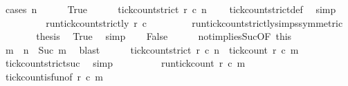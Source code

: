 \begin{isabellebody}
\ {\isacharparenleft}cases\ {\isacartoucheopen}n\ {\isacharequal}\ {}{\isacartoucheclose}{\isacharparenright}\isanewline
\ \ \isamarkupfalse%
\ True\isanewline
\ \ \ \ \isamarkupfalse%
\ {\isacartoucheopen}tick{\isacharunderscore}count{\isacharunderscore}strict\ r\ c\ n\ {\isacharequal}\ {}{\isacartoucheclose}\ \isamarkupfalse%
\ tick{\isacharunderscore}count{\isacharunderscore}strict{\isacharunderscore}def\ \isamarkupfalse%
\ simp\isanewline
\ \ \ \ \isamarkupfalse%
\ \isamarkupfalse%
\ {\isacartoucheopen}{\isachardot}{\isachardot}{\isachardot}\ {\isacharequal}\ run{\isacharunderscore}tick{\isacharunderscore}count{\isacharunderscore}strictly\ r\ c\ {}{\isacartoucheclose}\isanewline
\ \ \ \ \ \ \isamarkupfalse%
\ run{\isacharunderscore}tick{\isacharunderscore}count{\isacharunderscore}strictly{\isachardot}simps{\isacharparenleft}{}{\isacharparenright}{\isacharbrackleft}symmetric{\isacharbrackright}\ \isacommand{{\isachardot}}\isamarkupfalse%
\isanewline
\ \ \ \ \isamarkupfalse%
\ \isamarkupfalse%
\ {\isacharquery}thesis\ \isamarkupfalse%
\ True\ \isamarkupfalse%
\ simp\isanewline
{}\isamarkupfalse%
\isanewline
\ \ \isamarkupfalse%
\ False\isanewline
\ \ \ \ \isamarkupfalse%
\ not{}{\isacharunderscore}implies{\isacharunderscore}Suc{\isacharbrackleft}OF\ this{\isacharbrackright}\ \isamarkupfalse%
\ m\ \ {\isacharasterisk}{\isacharcolon}{\isacartoucheopen}n\ {\isacharequal}\ Suc\ m{\isacartoucheclose}\ \isamarkupfalse%
\ blast\isanewline
\ \ \ \ \isamarkupfalse%
\ {\isacartoucheopen}tick{\isacharunderscore}count{\isacharunderscore}strict\ r\ c\ n\ {\isacharequal}\ tick{\isacharunderscore}count\ r\ c\ m{\isacartoucheclose}\isanewline
\ \ \ \ \ \ \isamarkupfalse%
\ tick{\isacharunderscore}count{\isacharunderscore}strict{\isacharunderscore}suc\ \isamarkupfalse%
\ simp\isanewline
\ \ \ \ \isamarkupfalse%
\ \isamarkupfalse%
\ {\isacartoucheopen}{\isachardot}{\isachardot}{\isachardot}\ {\isacharequal}\ run{\isacharunderscore}tick{\isacharunderscore}count\ r\ c\ m{\isacartoucheclose}\ \isamarkupfalse%
\ tick{\isacharunderscore}count{\isacharunderscore}is{\isacharunderscore}fun{\isacharbrackleft}of\ {\isacartoucheopen}r{\isacartoucheclose}\ {\isacartoucheopen}c{\isacartoucheclose}\ {\isacartoucheopen}m{\isacartoucheclose}{\isacharbrackright}\ \isacommand{{\isachardot}}\isamarkupfalse%

\end{isabellebody}
